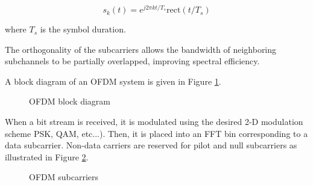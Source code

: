 \documentclass[conference]{IEEEtran}
\begin{document}
	 	\begin{equation}
	 		s_k(t) = e^{j2{\pi}kt/T_s}\text{rect}(t/T_s)
	 	\end{equation}
	 	
	 	where $T_s$ is the symbol duration.
	 	
	 	The orthogonality of the subcarriers allows the bandwidth of neighboring subchannels to be partially overlapped, improving spectral efficiency.
	 	
	 	A block diagram of an OFDM system is given in Figure \ref{fig::ofdm_block_diagram}.
		
	 	\begin{figure}[H]
	    		\centering
	    		\caption{OFDM block diagram}
	    		\label{fig::ofdm_block_diagram}
		\end{figure}
		
		When a bit stream is received, it is modulated using the desired 2-D modulation scheme PSK, QAM, etc...). Then, it is placed into an FFT bin corresponding to a data subcarrier. Non-data carriers are reserved for pilot and null subcarriers as illustrated in Figure \ref{fig::ofdm_subcarriers}.
		
		\begin{figure}[H]
	    		\centering
	    		\caption{OFDM subcarriers}
	    		\label{fig::ofdm_subcarriers}
		\end{figure}
		
\end{document}
